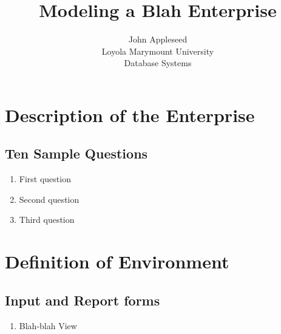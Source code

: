 \documentclass[11pt, a4paper]{report}
\title{Modeling a Blah Enterprise}
\author{John Appleseed\\ Loyola Marymount University\\ Database Systems}
\providecommand\phantomsection{}
\begin{document}
\clearpage
\phantomsection
{}
\maketitle

\clearpage
\phantomsection
{}
\tableofcontents
\setcounter{page}{2}
\setcounter{chapter}{2}

\chapter{Description of the Enterprise}


\clearpage
\section{Ten Sample Questions}
\begin{enumerate}
    \item First question
    \item Second question
    \item Third question
\end{enumerate}

\chapter{Definition of Environment}

\section{Input and Report forms}

\begin{enumerate}
\item Blah-blah View
 
\end{enumerate}
\end{document}
